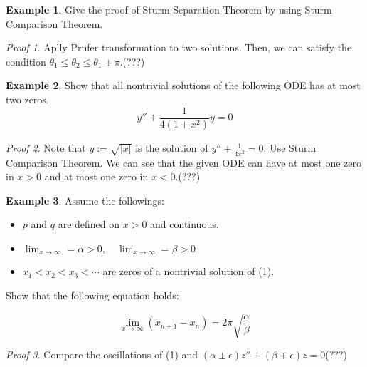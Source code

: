\documentclass[11pt,a4paper]{amsart}
\theoremstyle{definition}
\newtheorem{ex}{Example}
\theoremstyle{definition}
\theoremstyle{remark}
\newtheorem{prf}{Proof}
\begin{document}
\begin{ex}
Give the proof of Sturm Separation Theorem by using Sturm Comparison Theorem.
\begin{prf}
Aplly Prufer transformation to two solutions. Then, we can satisfy the condition $\theta_1 \leq \theta_2 \leq \theta_1 + \pi$.(???)
\end{prf}
\end{ex}

\begin{ex}
Show that all nontrivial solutions of the following ODE has at most two zeros.
$$y'' + \frac{1}{4(1+x^2)}y = 0$$

\begin{prf}
Note that $y:=\sqrt{|x|}$ is the solution of $\displaystyle{y'' + \frac{1}{4x^2} = 0}$. Use Sturm Comparison Theorem. We can see that the given ODE can have at most one zero in $x>0$ and at most one zero in $x<0$.(???)
\end{prf}
\end{ex}

\begin{ex}
Assume the followings:
\begin{itemize}
	\item $p$ and $q$ are defined on $x>0$ and continuous.
	\item $\displaystyle{\lim_{x \to \infty}=\alpha>0, \quad \lim_{x \to \infty}=\beta>0}$
	\item $x_1<x_2<x_3<\cdots$ are zeros of a nontrivial solution of (1).
\end{itemize}

Show that the following equation holds:

$$\displaystyle{\lim_{x \to \infty}(x_{n+1}-x_n)=2\pi \sqrt{\frac{\alpha}{\beta}}}$$

\begin{prf}
Compare the oscillations of (1) and $(\alpha \pm \epsilon)z'' + (\beta \mp \epsilon)z = 0$(???)
\end{prf}

\end{ex}
\end{document}
